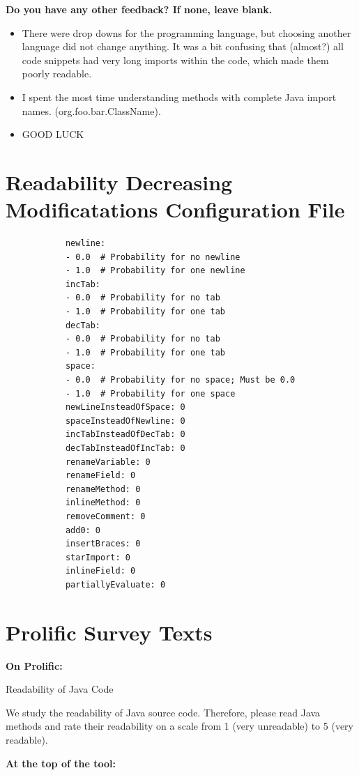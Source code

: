 \documentclass[%
class=scrreprt,
chapterprefix=false,%
open=right,%
twoside=false,%
paper=a4,%
logofile={Logo\_zentral\_farbig\_EN.png},%
thesistype=master,%
UKenglish,%
]{se2thesis}
\theoremstyle{definition}
\newcommand{\Mods}{Modificatations\xspace}
\newcommand{\RDHs}{Readability Decreasing \Mods\xspace}
\begin{document}
	\textbf{Do you have any other feedback? If none, leave blank.}
	\begin{itemize}
		\item There were drop downs for the programming language, but choosing another language did not change anything. It was a bit confusing that (almost?) all code snippets had very long imports within the code, which made them poorly readable.
		\item I spent the most time understanding methods with complete Java import names. (org.foo.bar.ClassName).
		\item GOOD LUCK
	\end{itemize}
	
\pagebreak
\section{\RDHs Configuration File}\label{appendix:rdh-config-file}
	\begin{listing}[h!]
		\begin{verbatim}
			newline:
			- 0.0  # Probability for no newline
			- 1.0  # Probability for one newline
			incTab:
			- 0.0  # Probability for no tab
			- 1.0  # Probability for one tab
			decTab:
			- 0.0  # Probability for no tab
			- 1.0  # Probability for one tab
			space:
			- 0.0  # Probability for no space; Must be 0.0
			- 1.0  # Probability for one space
			newLineInsteadOfSpace: 0
			spaceInsteadOfNewline: 0
			incTabInsteadOfDecTab: 0
			decTabInsteadOfIncTab: 0
			renameVariable: 0
			renameField: 0
			renameMethod: 0
			inlineMethod: 0
			removeComment: 0
			add0: 0
			insertBraces: 0
			starImport: 0
			inlineField: 0
			partiallyEvaluate: 0
		\end{verbatim}
		\label{lst:rdh-config-file}
	\end{listing}
	
\pagebreak
\section{Prolific Survey Texts}\label{appendix:prolific-survey-texts}
	\textbf{On Prolific:}
	
	Readability of Java Code
	
	We study the readability of Java source code. Therefore, please read Java methods and rate their readability on a scale from 1 (very unreadable) to 5 (very readable).
	
	\textbf{At the top of the tool:}
	
\end{document}
